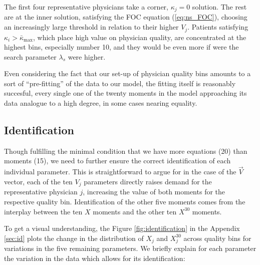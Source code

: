 \documentclass[../main.tex]{subfiles}
\begin{document}
The first four representative physicians take a corner, $\kappa_j = 0$ solution. The rest are at the inner solution, satisfying the FOC equation (\ref{eq:ns_FOC}), choosing an increasingly large threshold in relation to their higher $V_j$. Patients satisfying $\kappa_i > \bar{\kappa}_{\max}$, which place high value on physician quality, are concentrated at the highest bins, especially number 10, and they would be even more if were the search parameter $\lambda_s$ were higher.

Even considering the fact that our set-up of physician quality bins amounts to a sort of ``pre-fitting'' of the data to our model, the fitting itself is reasonably succesful, every single one of the twenty moments in the model approaching its data analogue to a high degree, in some cases nearing equality.

\subsection{Identification}

Though fulfilling the minimal condition that we have more equations (20) than moments (15), we need to further ensure the correct identification of each individual parameter. This is straightforward to argue for in the case of the $\vec{V}$ vector, each of the ten $V_j$ parameters directly raises demand for the representative physician $j$, increasing the value of both moments for the respective quality bin. Identification of the other five moments comes from the interplay between the ten $X$ moments and the other ten $X^{30}$ moments.

To get a visual understanding, the Figure \ref{fig:identification} in the Appendix \ref{sec:id} plots the change in the distribution of $X_j$ and $X_j^{30}$ across quality bins for variations in the five remaining parameters. We briefly explain for each parameter the variation in the data which allows for its identification:
\end{document}
